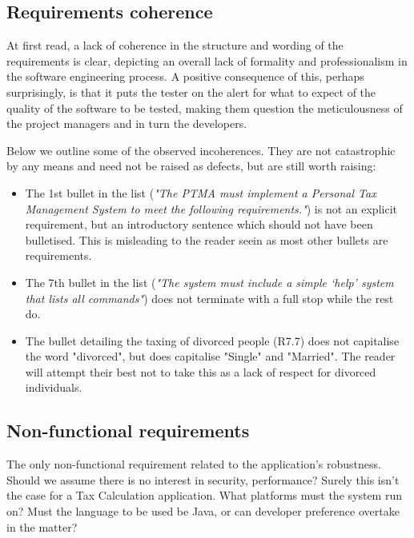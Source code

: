 \subsection{Requirements coherence}
At first read, a lack of coherence in the structure and wording of the requirements is clear, depicting an overall lack of formality and professionalism in the software engineering process. 
A positive consequence of this, perhaps surprisingly, is that it puts the tester on the alert for what to expect of the quality of the software to be tested, making them question the meticulousness of the project managers and in turn the developers.
\par
Below we outline some of the observed incoherences. They are not catastrophic by any means and need not be raised as defects, but are still worth raising:
\begin{itemize}
	\item The 1st bullet in the list (\textit{"The PTMA must implement a Personal Tax Management System to meet the following requirements."}) is not an explicit requirement, but an introductory sentence which should not have been bulletised. This is misleading to the reader seein as most other bullets are requirements. 
	\item The 7th bullet in the list (\textit{"The system must include a simple ‘help’ system that lists all commands"}) does not terminate with a full stop while the rest do. 
	\item The bullet detailing the taxing of divorced people (R7.7) does not capitalise the word "divorced", but does capitalise "Single" and "Married". The reader will attempt their best not to take this as a lack of respect for divorced individuals. 
\end{itemize}

\subsection{Non-functional requirements}
The only non-functional requirement related to the application's robustness. Should we assume there is no interest in security, performance? Surely this isn't the case for a Tax Calculation application. What platforms must the system run on? Must the language to be used be Java, or can developer preference overtake in the matter? 
\par

